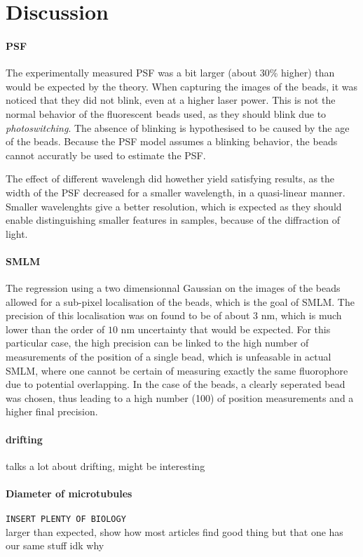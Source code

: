 \section{Discussion}
\paragraph{PSF}
The experimentally measured PSF was a bit larger (about $30$\% higher) than would be expected by the theory. When capturing the images of the beads, it was noticed that they did not blink, even at a higher laser power. This is not the normal behavior of the fluorescent beads used, as they should blink due to \emph{photoswitching}. The absence of blinking is hypothesised to be caused by the age of the beads. Because the PSF model assumes a blinking behavior, the beads cannot accuratly be used to estimate the PSF.

The effect of different wavelengh did howether yield satisfying results, as the width of the PSF decreased for a smaller wavelength, in a quasi-linear manner. Smaller wavelenghts give a better resolution, which is expected as they should enable distinguishing smaller features in samples, because of the diffraction of light.

\paragraph{SMLM}
The regression using a two dimensionnal Gaussian on the images of the beads allowed for a sub-pixel localisation of the beads, which is the goal of SMLM. The precision of this localisation was on found to be of about $3$ nm, which is much lower than the order of $10$ nm uncertainty that would be expected. For this particular case, the high precision can be linked to the high number of measurements of the position of a single bead, which is unfeasable in actual SMLM, where one cannot be certain of measuring exactly the same fluorophore due to potential overlapping. In the case of the beads, a clearly seperated bead was chosen, thus leading to a high number (100) of position measurements and a higher final precision.

\paragraph{drifting}
\cite{martens_raw_2022} talks a lot about drifting, might be interesting

\paragraph{Diameter of microtubules}
\verb|INSERT PLENTY OF BIOLOGY| \\
larger than expected, show how most articles find good thing but that one has our same stuff idk why

